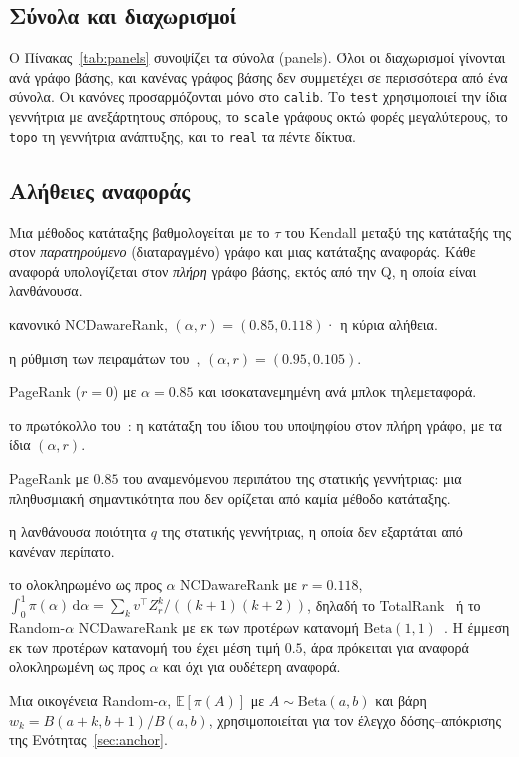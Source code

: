 \documentclass[11pt,a4paper]{article}
\theoremstyle{definition}
\theoremstyle{remark}
\newcommand{\Exp}{\mathbb{E}}
\begin{document}
\subsection{Σύνολα και διαχωρισμοί}
Ο Πίνακας~\ref{tab:panels} συνοψίζει τα σύνολα (panels). Όλοι οι διαχωρισμοί γίνονται ανά γράφο βάσης,
και κανένας γράφος βάσης δεν συμμετέχει σε περισσότερα από ένα σύνολα. Οι κανόνες προσαρμόζονται μόνο
στο \texttt{calib}. Το \texttt{test} χρησιμοποιεί την ίδια γεννήτρια με ανεξάρτητους σπόρους, το
\texttt{scale} γράφους οκτώ φορές μεγαλύτερους, το \texttt{topo} τη γεννήτρια ανάπτυξης, και το
\texttt{real} τα πέντε δίκτυα.



\subsection{Αλήθειες αναφοράς}
\label{sec:truths}
Μια μέθοδος κατάταξης βαθμολογείται με το $\tau$ του Kendall μεταξύ της κατάταξής της στον
\emph{παρατηρούμενο} (διαταραγμένο) γράφο και μιας κατάταξης αναφοράς. Κάθε αναφορά υπολογίζεται στον
\emph{πλήρη} γράφο βάσης, εκτός από την Q, η οποία είναι λανθάνουσα.
\begin{description}[leftmargin=1.2em,itemsep=1pt,font=\normalfont\bfseries]
\item[NCD] κανονικό NCDawareRank, $(\alpha,r)=(0.85,0.118)$· η κύρια αλήθεια.
\item[NCD95] η ρύθμιση των πειραμάτων του~\cite{ng13}, $(\alpha,r)=(0.95,0.105)$.
\item[PR] PageRank ($r=0$) με $\alpha=0.85$ και ισοκατανεμημένη ανά μπλοκ τηλεμεταφορά.
\item[SELF] το πρωτόκολλο του~\cite{ng13}: η κατάταξη του ίδιου του υποψηφίου στον πλήρη γράφο, με τα
ίδια $(\alpha,r)$.
\item[POP] PageRank με $0.85$ του αναμενόμενου περιπάτου της στατικής γεννήτριας: μια πληθυσμιακή
σημαντικότητα που δεν ορίζεται από καμία μέθοδο κατάταξης.
\item[Q] η λανθάνουσα ποιότητα $q$ της στατικής γεννήτριας, η οποία δεν εξαρτάται από κανέναν περίπατο.
\item[TOT] το ολοκληρωμένο ως προς $\alpha$ NCDawareRank με $r=0.118$,
$\int_0^1\pi(\alpha)\,\mathrm d\alpha=\sum_k v^\top Z_r^k/((k+1)(k+2))$, δηλαδή το
TotalRank~\cite{boldi05tr} ή το Random-$\alpha$ NCDawareRank με εκ των προτέρων κατανομή
$\mathrm{Beta}(1,1)$~\cite{constantine09}. Η έμμεση εκ των προτέρων κατανομή του έχει μέση τιμή $0.5$,
άρα πρόκειται για αναφορά ολοκληρωμένη ως προς $\alpha$ και όχι για ουδέτερη αναφορά.
\end{description}
Μια οικογένεια Random-$\alpha$, $\Exp[\pi(A)]$ με $A\sim\mathrm{Beta}(a,b)$ και βάρη
$w_k=B(a+k,b+1)/B(a,b)$, χρησιμοποιείται για τον έλεγχο δόσης--απόκρισης της
Ενότητας~\ref{sec:anchor}.
\end{document}
